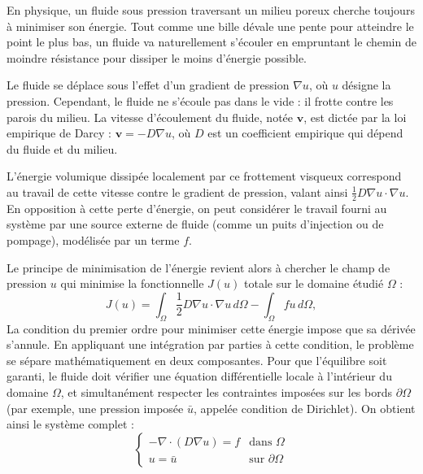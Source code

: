 \documentclass[12pt,a4paper]{article}
\begin{document}
En physique, un fluide sous pression traversant un milieu poreux cherche toujours 
à minimiser son énergie. Tout comme une bille dévale une pente pour atteindre le 
point le plus bas, un fluide va naturellement s'écouler en empruntant le chemin de moindre 
résistance pour dissiper le moins d'énergie possible.

Le fluide se déplace sous l'effet d'un gradient de pression $\nabla u$, où $u$ désigne la pression. 
Cependant, le fluide ne s'écoule pas dans le vide : il frotte contre les parois du milieu. La vitesse d'écoulement du fluide, notée $\mathbf{v}$, est dictée par la loi empirique de Darcy \cite{darcy_wiki} : 
$\mathbf{v} = -D \nabla u$, où $D$ est un coefficient empirique qui dépend du fluide et du milieu.

L'énergie volumique dissipée localement par ce frottement visqueux correspond au travail de cette vitesse contre le gradient de pression, valant ainsi $\frac{1}{2} D \nabla u \cdot \nabla u$. 
En opposition à cette perte d'énergie, on peut considérer le travail fourni au système 
par une source externe de fluide (comme un puits d'injection ou de pompage), modélisée 
par un terme $f$.

Le principe de minimisation de l'énergie revient alors à chercher le champ de pression $u$ 
qui minimise la fonctionnelle $J(u)$ totale sur le domaine étudié $\Omega$ :
\begin{equation*}
    J(u) = \int_{\Omega} \frac{1}{2} D \nabla u \cdot \nabla u \, d\Omega - \int_{\Omega} f u \, d\Omega,
\end{equation*}
La condition du premier ordre pour minimiser cette énergie impose que sa dérivée s'annule. En appliquant une intégration par parties à cette condition, le problème se sépare mathématiquement en deux composantes. Pour que l'équilibre soit garanti, le fluide doit vérifier une équation différentielle locale à l'intérieur du domaine $\Omega$, et simultanément respecter les contraintes imposées sur les bords $\partial \Omega$ (par exemple, une pression imposée $\bar{u}$, appelée condition de Dirichlet). On obtient ainsi le système complet \cite{darcy_wiki} :
\begin{equation}
  \label{probleme Darcy}
    \begin{cases}
        -\nabla \cdot (D \nabla u) = f & \text{dans } \Omega \\
        u = \bar{u} & \text{sur } \partial \Omega
    \end{cases}
\end{equation}
\end{document}
